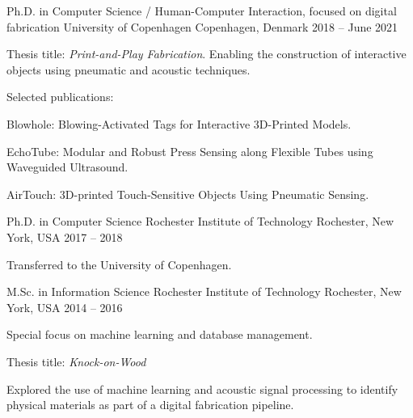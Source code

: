 
\begin{cventries}

  \cventry
    {Ph.D. in Computer Science / Human-Computer Interaction, focused on digital fabrication}
    {University of Copenhagen}
    {Copenhagen, Denmark}
    {2018 -- June 2021}
    {
      \begin{cvitems}
        \item Thesis title: \emph{Print-and-Play Fabrication}. Enabling the
          construction of interactive objects using pneumatic and acoustic
          techniques.
        \item Selected publications:
        \item \hspace{1em} Blowhole: Blowing-Activated Tags for Interactive 3D-Printed Models.
        \item \hspace{1em} EchoTube: Modular and Robust Press Sensing along Flexible Tubes using Waveguided Ultrasound.
        \item \hspace{1em} AirTouch: 3D-printed Touch-Sensitive Objects Using Pneumatic Sensing.
      \end{cvitems}
      \vspace{1em}
    }

  \cventry
    {Ph.D. in Computer Science}
    {Rochester Institute of Technology}
    {Rochester, New York, USA}
    {2017 -- 2018}
    {
      \begin{cvitems}
        \item Transferred to the University of Copenhagen.
      \end{cvitems}
      \vspace{1em}
    }

  \cventry
    {M.Sc. in Information Science}
    {Rochester Institute of Technology}
    {Rochester, New York, USA}
    {2014 -- 2016}
    {
      \begin{cvitems}
        \item Special focus on machine learning and database management.
        \item Thesis title: \emph{Knock-on-Wood}
        \item \hspace{1em} Explored the use of machine learning and acoustic
          signal processing to identify physical materials as part of a digital
          fabrication pipeline.
      \end{cvitems}
      \vspace{1em}
    }


\end{cventries}
